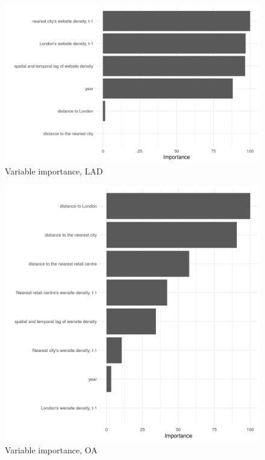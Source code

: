 \documentclass[
  authoryear,
  preprint,
  3p]{elsarticle}
\begin{document}
\begin{figure}

{\centering \includegraphics[width=1\textwidth,height=\textheight]{../../outputs/rf/figures/varimp_LA.png}

}

\caption{\label{var.imp.LAD}Variable importance, LAD}

\end{figure}

\begin{figure}

{\centering \includegraphics[width=1\textwidth,height=\textheight]{../../outputs/rf/figures/varimp_OA.png}

}

\caption{\label{var.imp.OA}Variable importance, OA}

\end{figure}
\end{document}
